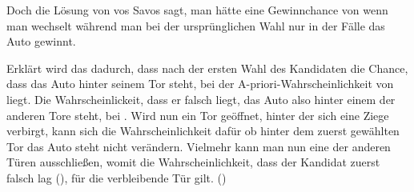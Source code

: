 Doch die Lösung von vos Savos sagt, man hätte eine Gewinnchance von  wenn man wechselt während man bei der ursprünglichen Wahl nur in  der Fälle das Auto gewinnt.

Erklärt wird das dadurch, dass nach der ersten Wahl des Kandidaten die Chance, dass das Auto hinter seinem Tor steht, bei der A-priori-Wahrscheinlichkeit von  liegt. Die Wahrscheinlickeit, dass er falsch liegt, das Auto also hinter einem der anderen Tore steht, bei . Wird nun ein Tor geöffnet, hinter der sich eine Ziege verbirgt, kann sich die Wahrscheinlichkeit dafür ob hinter dem zuerst gewählten Tor das Auto steht nicht verändern. Vielmehr kann man nun eine der anderen Türen ausschließen, womit die Wahrscheinlichkeit, dass der Kandidat zuerst falsch lag (), für die verbleibende Tür gilt. (\cite{Savant:1990})
